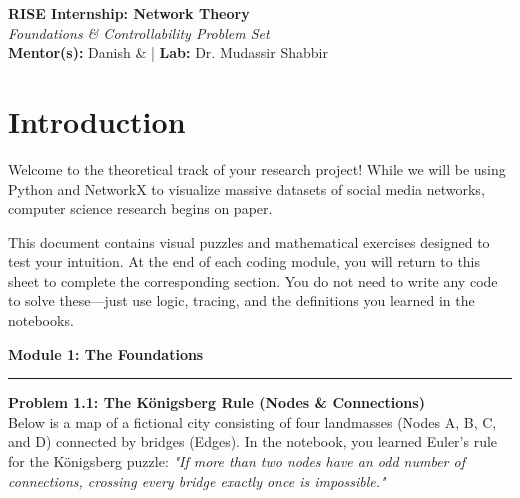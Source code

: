 \documentclass[12pt, a4paper]{article}
\newcommand{\moduleheader}[1]{
    \vspace{1cm}
    {\Large \textcolor{riseblue}{\textbf{#1}}}
    \vspace{0.3cm}
    \hrule
    \vspace{0.5cm}
}
\begin{document}
\begin{center}
    {\Huge \textbf{RISE Internship: Network Theory}} \\[0.3cm]
    {\Large \textit{Foundations \& Controllability Problem Set}} \\[0.5cm]
    \textbf{Mentor(s):} Danish \& \underline{\hspace{3cm}} \quad | \quad \textbf{Lab:} Dr. Mudassir Shabbir
\end{center}
\vspace{0.5cm}

\section*{Introduction}
Welcome to the theoretical track of your research project! While we will be using Python and NetworkX to visualize massive datasets of social media networks, computer science research begins on paper. 

This document contains visual puzzles and mathematical exercises designed to test your intuition. At the end of each coding module, you will return to this sheet to complete the corresponding section. You do not need to write any code to solve these—just use logic, tracing, and the definitions you learned in the notebooks.

\moduleheader{Module 1: The Foundations}

\textbf{Problem 1.1: The Königsberg Rule (Nodes \& Connections)} \\
Below is a map of a fictional city consisting of four landmasses (Nodes A, B, C, and D) connected by bridges (Edges). In the notebook, you learned Euler's rule for the Königsberg puzzle: \textit{"If more than two nodes have an odd number of connections, crossing every bridge exactly once is impossible."}

\begin{center}
\end{center}
\end{document}
